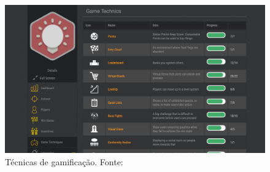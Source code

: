 \begin{figure}[h]
	\centering
		\includegraphics[keepaspectratio=true,scale=0.3]{figuras/tecniques.png}
	\caption{Técnicas de gamificação. Fonte: \cite{funifier}\label{tecnicas}
}
\end{figure}


